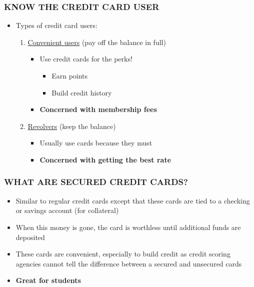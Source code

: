 \documentclass[12pt]{article}
\begin{document}
                \subsubsection{KNOW THE CREDIT CARD USER}
                    \begin{itemize}
                        \item Types of credit card users:
                            \begin{enumerate}
                                \item \underline{Convenient users} (pay off the balance in full)
                                    \begin{itemize}
                                        \item Use credit cards for the perks!
                                            \begin{itemize}
                                                \item Earn points
                                                \item Build credit history
                                            \end{itemize}
                                        \item \textbf{Concerned with membership fees}
                                    \end{itemize}
                                \item \underline{Revolvers} (keep the balance)
                                    \begin{itemize}
                                        \item Usually use cards because they must
                                        \item \textbf{Concerned with getting the best rate}
                                    \end{itemize}
                            \end{enumerate}
                    \end{itemize}
                \subsubsection{WHAT ARE SECURED CREDIT CARDS?}
                    \begin{itemize}
                        \item Similar to regular credit cards except that these cards are tied to a checking or savings account (for collateral)
                        \item When this money is gone, the card is worthless until additional funds are deposited
                        \item These cards are convenient, especially to build credit as credit scoring agencies cannot tell the difference between
                            a secured and unsecured cards
                        \item \textbf{Great for students}
                    \end{itemize}
\end{document}
